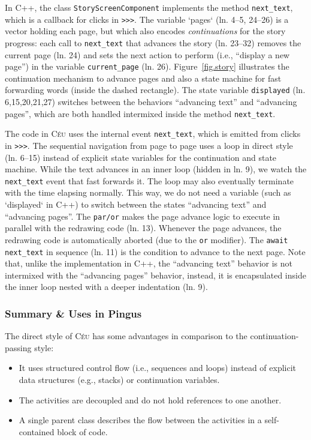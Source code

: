 \documentclass{vgtc}                          %
\newcommand{\CEU}{\textsc{C\'{e}u}\xspace}
\newcommand{\code}[1] {{\small{\texttt{#1}}}}
\begin{document}
In C++, the class \code{StoryScreenComponent} implements the method
\code{next\_text}, which is a callback for clicks in \code{>>>}.
%
The variable `pages` (ln. 4--5, 24--26) is a vector holding each page, but
which also encodes \emph{continuations} for the story progress:
each call to \code{next\_text} that advances the story (ln. 23--32) removes the 
current page (ln. 24) and sets the next action to perform (i.e., ``display a
new page'') in the variable \code{current\_page} (ln. 26).
Figure~\ref{fig.story} illustrates the continuation mechanism to advance 
pages and also a state machine for fast forwarding words (inside the dashed
rectangle).
The state variable \code{displayed} (ln. 6,15,20,21,27) switches between the
behaviors ``advancing text'' and ``advancing pages'', which are both handled
intermixed inside the method \code{next\_text}.

The code in \CEU uses the internal event \code{next\_text}, which is emitted
from clicks in \code{>>>}.
%
The sequential navigation from page to page uses a loop in direct style
(ln. 6--15) instead of explicit state variables for the continuation and state
machine.
While the text advances in an inner loop (hidden in ln. 9), we watch the
\code{next\_text} event that fast forwards it.
The loop may also eventually terminate with the time elapsing normally.
This way, we do not need a variable (such as `displayed` in C++) to switch 
between the states ``advancing text'' and ``advancing pages''.
The \code{par/or} makes the page advance logic to execute in parallel with the
redrawing code (ln. 13).
Whenever the page advances, the redrawing code is automatically aborted
(due to the \code{or} modifier).
The \code{await next\_text} in sequence (ln. 11) is the condition to advance to
the next page.
%
Note that, unlike the implementation in C++, the ``advancing text'' behavior is
not intermixed with the ``advancing pages'' behavior, instead, it is
encapsulated inside the inner loop nested with a deeper indentation (ln. 9).

\subsubsection{Summary \& Uses in Pingus}

The direct style of \CEU has some advantages in comparison to the 
continuation-passing style:
%
\begin{itemize}
\item It uses structured control flow (i.e., sequences and loops) instead of 
      explicit data structures (e.g., stacks) or continuation variables.
\item The activities are decoupled and do not hold references to one another.
\item A single parent class describes the flow between the activities in a 
      self-contained block of code.
\end{itemize}
\end{document}
